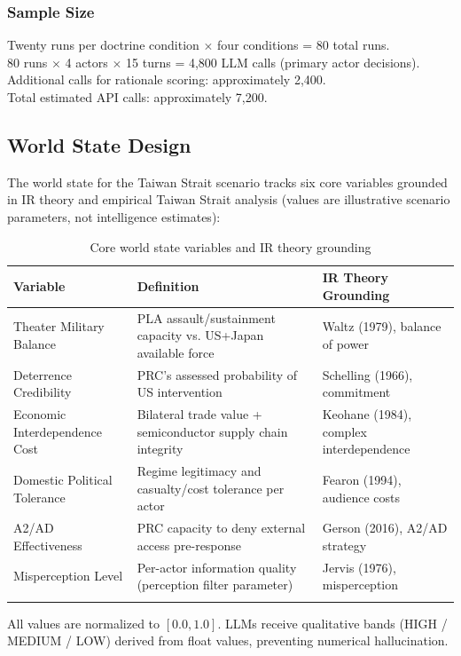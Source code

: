 \documentclass[12pt, a4paper]{article}
\begin{document}
\subsubsection{Sample Size}

Twenty runs per doctrine condition $\times$ four conditions = 80 total runs.\\
80 runs $\times$ 4 actors $\times$ 15 turns = 4,800 LLM calls (primary actor decisions).\\
Additional calls for rationale scoring: approximately 2,400.\\
Total estimated API calls: approximately 7,200.

\subsection{World State Design}

The world state for the Taiwan Strait scenario tracks six core variables grounded in IR theory and empirical Taiwan Strait analysis (values are illustrative scenario parameters, not intelligence estimates):

\begin{longtable}{p{4cm} p{5cm} p{4cm}}
\toprule
\textbf{Variable} & \textbf{Definition} & \textbf{IR Theory Grounding} \\
\midrule
Theater Military Balance & PLA assault/sustainment capacity vs. US+Japan available force & Waltz (1979), balance of power \\
Deterrence Credibility & PRC's assessed probability of US intervention & Schelling (1966), commitment \\
Economic Interdependence Cost & Bilateral trade value + semiconductor supply chain integrity & Keohane (1984), complex interdependence \\
Domestic Political Tolerance & Regime legitimacy and casualty/cost tolerance per actor & Fearon (1994), audience costs \\
A2/AD Effectiveness & PRC capacity to deny external access pre-response & Gerson (2016), A2/AD strategy \\
Misperception Level & Per-actor information quality (perception filter parameter) & Jervis (1976), misperception \\
\bottomrule
\caption{Core world state variables and IR theory grounding}
\end{longtable}

All values are normalized to $[0.0, 1.0]$. LLMs receive qualitative bands (HIGH / MEDIUM / LOW) derived from float values, preventing numerical hallucination.
\end{document}
